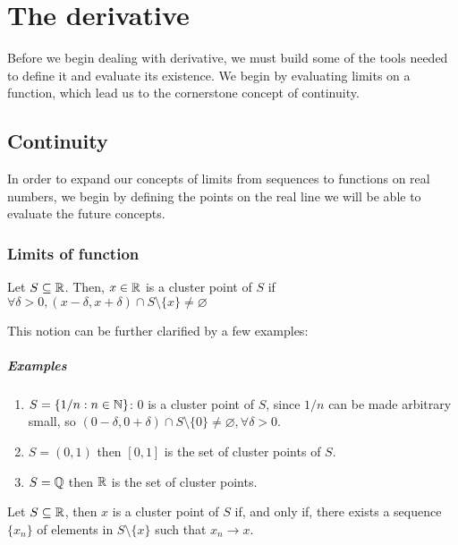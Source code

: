 \chapter{The derivative}

Before we begin dealing with derivative, we must build some of the tools needed to define it and evaluate its existence. We begin by evaluating limits on a function, which lead us to the cornerstone concept of continuity. 

\section{Continuity}

In order to expand our concepts of limits from sequences to functions on real numbers, we begin by defining the points on the real line we will be able to evaluate the future concepts.

\subsection{Limits of function}

\begin{definition}
    Let $S \subseteq \mathbb{R}$. Then, $x \in \mathbb{R}$ is a cluster point of $S$ if $\forall \delta > 0, (x-\delta, x+ \delta) \cap S \setminus\{x\} \neq \varnothing$
\end{definition}

This notion can be further clarified by a few examples:
\paragraph{Examples}
\begin{enumerate}
    \item $S = \{1/n: n \in \mathbb{N}\}$: $0$ is a cluster point of $S$, since $1/n$ can be made arbitrary small, so $ (0 - \delta, 0 + \delta) \cap S \setminus \{0\} \neq \varnothing, \forall \delta > 0$.
    \item $S = (0,1)$ then $[0,1]$ is the set of cluster points of $S$.
    \item $S = \mathbb{Q}$ then $\mathbb{R}$ is the set of cluster points.
\end{enumerate}

\begin{theorem}
    Let $S \subseteq \mathbb{R}$, then $x$ is a cluster point of $S$ if, and only if, there exists a sequence $\{x_n\}$ of elements in $S \setminus \{x\}$ such that $x_n \to x$.
\end{theorem}


